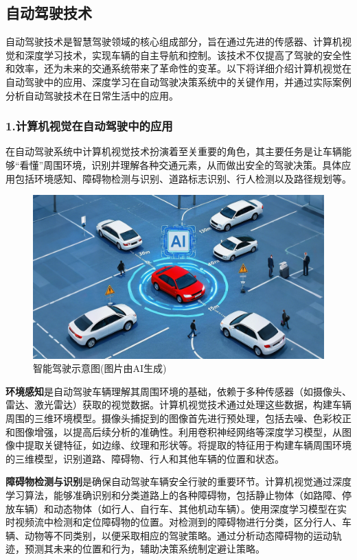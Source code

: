 \subsection{自动驾驶技术}

自动驾驶技术是智慧驾驶领域的核心组成部分，旨在通过先进的传感器、计算机视觉和深度学习技术，实现车辆的自主导航和控制。该技术不仅提高了驾驶的安全性和效率，还为未来的交通系统带来了革命性的变革。以下将详细介绍计算机视觉在自动驾驶中的应用、深度学习在自动驾驶决策系统中的关键作用，并通过实际案例分析自动驾驶技术在日常生活中的应用。

\subsubsection{1.计算机视觉在自动驾驶中的应用}

在自动驾驶系统中计算机视觉技术扮演着至关重要的角色，其主要任务是让车辆能够“看懂”周围环境，识别并理解各种交通元素，从而做出安全的驾驶决策。具体应用包括环境感知、障碍物检测与识别、道路标志识别、行人检测以及路径规划等。

\begin{figure}[ht]
  \centering
  \includegraphics[width=\linewidth]{image/4/新_智能驾驶.png}
  \caption{智能驾驶示意图(图片由AI生成)}
  \label{fig:智能驾驶}
\end{figure}

\textbf{环境感知}是自动驾驶车辆理解其周围环境的基础，依赖于多种传感器（如摄像头、雷达、激光雷达）获取的视觉数据。计算机视觉技术通过处理这些数据，构建车辆周围的三维环境模型。摄像头捕捉到的图像首先进行预处理，包括去噪、色彩校正和图像增强，以提高后续分析的准确性。利用卷积神经网络等深度学习模型，从图像中提取关键特征，如边缘、纹理和形状等。将提取的特征用于构建车辆周围环境的三维模型，识别道路、障碍物、行人和其他车辆的位置和状态。

\textbf{障碍物检测与识别}是确保自动驾驶车辆安全行驶的重要环节。计算机视觉通过深度学习算法，能够准确识别和分类道路上的各种障碍物，包括静止物体（如路障、停放车辆）和动态物体（如行人、自行车、其他机动车辆）。使用深度学习模型在实时视频流中检测和定位障碍物的位置。对检测到的障碍物进行分类，区分行人、车辆、动物等不同类别，以便采取相应的驾驶策略。通过分析动态障碍物的运动轨迹，预测其未来的位置和行为，辅助决策系统制定避让策略。


